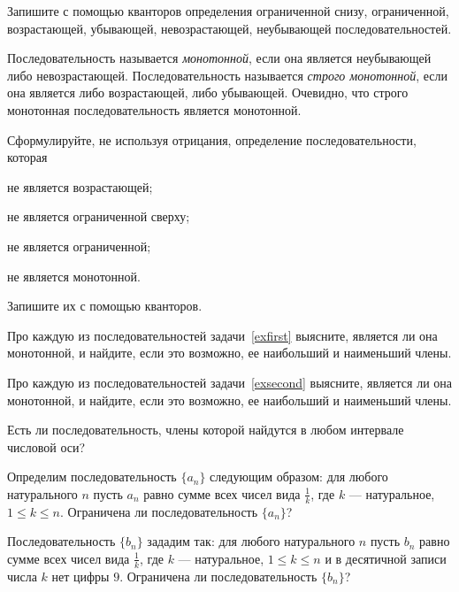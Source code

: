\documentclass[a4paper, 12pt, num=24, date=06.11.2019]{listok}
\begin{document}
\begin{problem}
    Запишите с помощью кванторов определения ограниченной снизу, ограниченной, возрастающей, убывающей, невозрастающей, неубывающей последовательностей.
\end{problem}
\begin{definition}
    Последовательность называется \textit{монотонной}, если она является неубывающей либо невозрастающей.
    Последовательность называется \textit{строго монотонной}, если она является либо возрастающей, либо убывающей.
    Очевидно, что строго монотонная последовательность является монотонной.
\end{definition}
\begin{problem}
    Сформулируйте, не используя отрицания, определение последовательности, которая
    \begin{probparts}
        \item не является возрастающей;
        \item не является ограниченной сверху;
        \item не является ограниченной;
        \item не является монотонной.
    \end{probparts}
    Запишите их с помощью кванторов.
\end{problem}
\begin{problem}
    Про каждую из последовательностей задачи~\ref{exfirst} выясните, является ли она монотонной, и найдите, если это возможно, ее наибольший и наименьший члены.
\end{problem}
\begin{problem}
    Про каждую из последовательностей задачи~\ref{exsecond} выясните, является ли она монотонной, и найдите, если это возможно, ее наибольший и наименьший члены.
\end{problem}
\begin{problem}
    Есть ли последовательность, члены которой найдутся в любом интервале числовой оси?
\end{problem}
\begin{problem}
\begin{probparts}
    \item Определим последовательность $\{a_n\}$ следующим образом:
    для любого натурального $n$ пусть $a_n$ равно сумме всех чисел вида $\frac1k$, где $k$ --- натуральное, $1 \le k \le n$.
    Ограничена ли последовательность $\{a_n\}$?
    \item Последовательность $\{b_n\}$ зададим так: для любого натурального $n$ пусть $b_n$ равно сумме всех чисел вида $\frac1k$,
    где $k$ --- натуральное, $1 \le k \le n$ и в десятичной записи числа $k$ нет цифры $9$. Ограничена ли последовательность $\{b_n\}$?
\end{probparts}
\end{problem}
\end{document}
